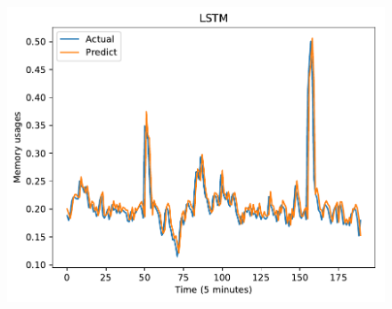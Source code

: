 \documentclass[11pt,twoside]{article}
\begin{document}
\begin{multicols}{2}
\begin{figure}[!ht]
\begin{minipage}[b]{0.33\linewidth}
    \includegraphics[width=0.9\linewidth]{images/pdf/predict/k5/ram_k5_lstm.pdf} 
  \end{minipage} 
  

\end{figure}
\end{multicols}
\end{document}

